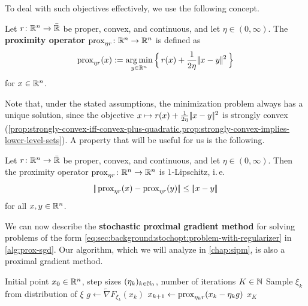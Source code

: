 To deal with such objectives effectively, we use the following concept.
\begin{definition}
    Let $r\colon\mathbb{R}^n \to \bar{\mathbb{R}}$ be proper, convex, and continuous, and let $\eta \in (0,\infty)$.
    The \textbf{proximity operator}
    $\operatorname{prox}_{\eta r}\colon \mathbb{R}^n\to\mathbb{R}^n$ is defined as
    \[
        \operatorname{prox}_{\eta r}(x) := \operatorname*{arg\,min}_{y\in\mathbb{R}^n} \Big\{\, r(x) + \frac{1}{2\eta}|\!|x - y|\!|^2 \,\Big\}
    \]
    for $x\in\mathbb{R}^n$.
\end{definition}
Note that, under the stated assumptions, the minimization problem always has a unique solution, since the objective
$x\mapsto r(x) + \frac{1}{2\eta}|\!|x - y|\!|^2$ is strongly convex
(\cref{prop:strongly-convex-iff-convex-plus-quadratic,prop:strongly-convex-implies-lower-level-sets}).
A property that will be useful for us is the following.
\begin{proposition}
    \label{prop:prox-is-lipschitz}
    Let $r\colon\mathbb{R}^n \to \bar{\mathbb{R}}$ be proper, convex, and continuous, and let $\eta \in (0,\infty)$. Then the
    proximity operator $\operatorname{prox}_{\eta r}\colon \mathbb{R}^n\to\mathbb{R}^n$ is $1$-Lipschitz, i.\,e.
    \[
        |\!|\operatorname{prox}_{\eta r}(x) - \operatorname{prox}_{\eta r}(y)|\!| \leq |\!|x - y|\!|
    \]
    for all $x,y\in\mathbb{R}^n$.
\end{proposition}
We can now describe the \textbf{stochastic proximal gradient method} for solving
problems of the form
\eqref{eq:sec:background:stochopt:problem-with-regularizer} in \cref{alg:prox-sgd}.
Our algorithm, which we will analyze in \cref{chap:sipm}, is also a
proximal gradient method.
\begin{algorithm}[t]
\caption{Stochastic Proximal Gradient Descent (SPGD)}
\label{alg:prox-sgd}
\begin{algorithmic}[1] %
\Require Initial point $x_0\in\mathbb{R}^n$, step sizes $(\eta_k)_{k\in\mathbb{N}_0}$, number of iterations $K\in\mathbb{N}$
    \State Sample $\xi_k$ from distribution of $\xi$
    \State $g \gets \tilde{\nabla} F_{\xi_k}(x_k)$
    \State $x_{k+1} \gets \operatorname{prox}_{\eta_k r}(x_k - \eta_k g)$
\EndFor
\State \Return $x_{K}$
\end{algorithmic}
\end{algorithm}

